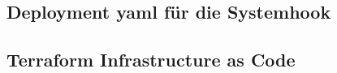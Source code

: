 \subsection{Deployment yaml für die Systemhook}
\label{app:yamlFile}

\clearpage

\subsection{Terraform Infrastructure as Code}
\label{app:terraform}

\clearpage


